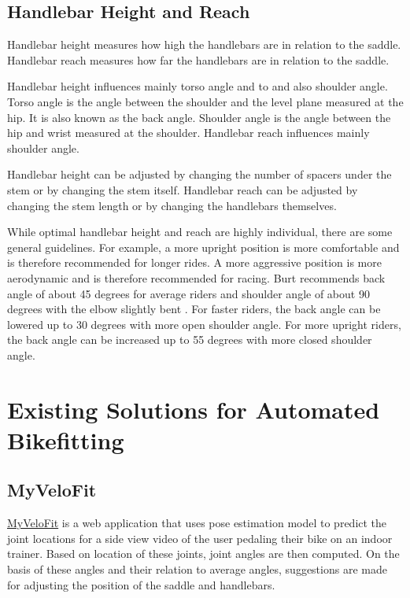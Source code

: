 \subsection{Handlebar Height and Reach}
Handlebar height measures how high the handlebars are in relation to the saddle. Handlebar reach measures how far the handlebars are in relation to the saddle.

Handlebar height influences mainly torso angle and to and also shoulder angle. Torso angle is the angle between the shoulder and the level plane measured at the hip. It is also known as the back angle. Shoulder angle is the angle between the hip and wrist measured at the shoulder. Handlebar reach influences mainly shoulder angle.

Handlebar height can be adjusted by changing the number of spacers under the stem or by changing the stem itself. Handlebar reach can be adjusted by changing the stem length or by changing the handlebars themselves.

While optimal handlebar height and reach are highly individual, there are some general guidelines. For example, a more upright position is more comfortable and is therefore recommended for longer rides. A more aggressive position is more aerodynamic and is therefore recommended for racing. Burt recommends back angle of about 45 degrees for average riders and shoulder angle of about 90 degrees with the elbow slightly bent \cite{burtbikefit}. For faster riders, the back angle can be lowered up to 30 degrees with more open shoulder angle. For more upright riders, the back angle can be increased up to 55 degrees with more closed shoulder angle.



\section{Existing Solutions for Automated Bikefitting}

\subsection{MyVeloFit}
\href{https://www.myvelofit.com/}{MyVeloFit}  is a web application that uses pose estimation model to predict the joint locations for a side view video of the user pedaling their bike on an indoor trainer. Based on location of these joints, joint angles are then computed. On the basis of these angles and their relation to average angles, suggestions are made for adjusting the position of the saddle and handlebars.

